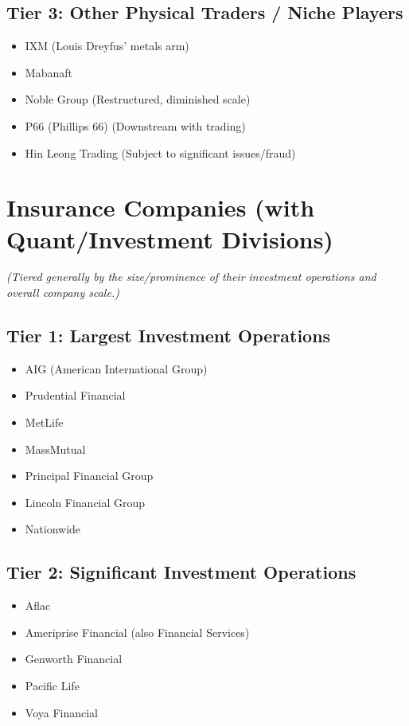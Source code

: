 \documentclass[11pt,a4paper]{article}
\begin{document}
\subsection*{Tier 3: Other Physical Traders / Niche Players}
\begin{multicols}{3}
\begin{itemize}[label=\textbullet, leftmargin=*, itemsep=1pt, parsep=0pt]
    \item IXM (Louis Dreyfus' metals arm)
    \item Mabanaft
    \item Noble Group (Restructured, diminished scale)
    \item P66 (Phillips 66) (Downstream with trading)
    \item Hin Leong Trading (Subject to significant issues/fraud)
\end{itemize}
\end{multicols}

\section*{Insurance Companies (with Quant/Investment Divisions)}
\begin{center}
\footnotesize
\textit{(Tiered generally by the size/prominence of their investment operations and overall company scale.)}
\end{center}

\subsection*{Tier 1: Largest Investment Operations}
\begin{multicols}{3}
\begin{itemize}[label=\textbullet, leftmargin=*, itemsep=1pt, parsep=0pt]
    \item AIG (American International Group)
    \item Prudential Financial
    \item MetLife
    \item MassMutual
    \item Principal Financial Group
    \item Lincoln Financial Group
    \item Nationwide
\end{itemize}
\end{multicols}

\subsection*{Tier 2: Significant Investment Operations}
\begin{multicols}{3}
\begin{itemize}[label=\textbullet, leftmargin=*, itemsep=1pt, parsep=0pt]
    \item Aflac
    \item Ameriprise Financial (also Financial Services)
    \item Genworth Financial
    \item Pacific Life
    \item Voya Financial
\end{itemize}
\end{multicols}
\end{document}
